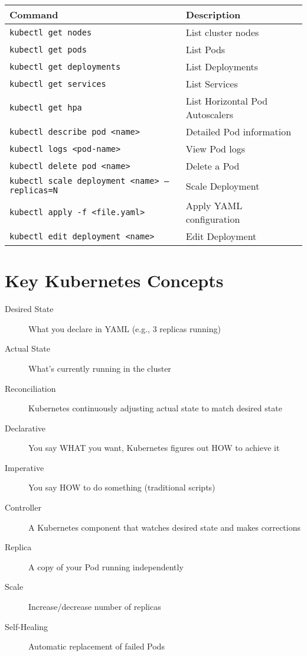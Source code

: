 \documentclass[12pt,a4paper]{article}
\begin{document}
\begin{table}[H]
\centering
\small
\begin{tabularx}{\textwidth}{|l|X|}
\toprule
\textbf{Command} & \textbf{Description} \\
\midrule
\texttt{kubectl get nodes} & List cluster nodes \\
\texttt{kubectl get pods} & List Pods \\
\texttt{kubectl get deployments} & List Deployments \\
\texttt{kubectl get services} & List Services \\
\texttt{kubectl get hpa} & List Horizontal Pod Autoscalers \\
\texttt{kubectl describe pod <name>} & Detailed Pod information \\
\texttt{kubectl logs <pod-name>} & View Pod logs \\
\texttt{kubectl delete pod <name>} & Delete a Pod \\
\texttt{kubectl scale deployment <name> --replicas=N} & Scale Deployment \\
\texttt{kubectl apply -f <file.yaml>} & Apply YAML configuration \\
\texttt{kubectl edit deployment <name>} & Edit Deployment \\
\bottomrule
\end{tabularx}
\end{table}

\section{Key Kubernetes Concepts}

\begin{description}
    \item[Desired State] What you declare in YAML (e.g., 3 replicas running)
    \item[Actual State] What's currently running in the cluster
    \item[Reconciliation] Kubernetes continuously adjusting actual state to match desired state
    \item[Declarative] You say WHAT you want, Kubernetes figures out HOW to achieve it
    \item[Imperative] You say HOW to do something (traditional scripts)
    \item[Controller] A Kubernetes component that watches desired state and makes corrections
    \item[Replica] A copy of your Pod running independently
    \item[Scale] Increase/decrease number of replicas
    \item[Self-Healing] Automatic replacement of failed Pods
\end{description}
\end{document}
